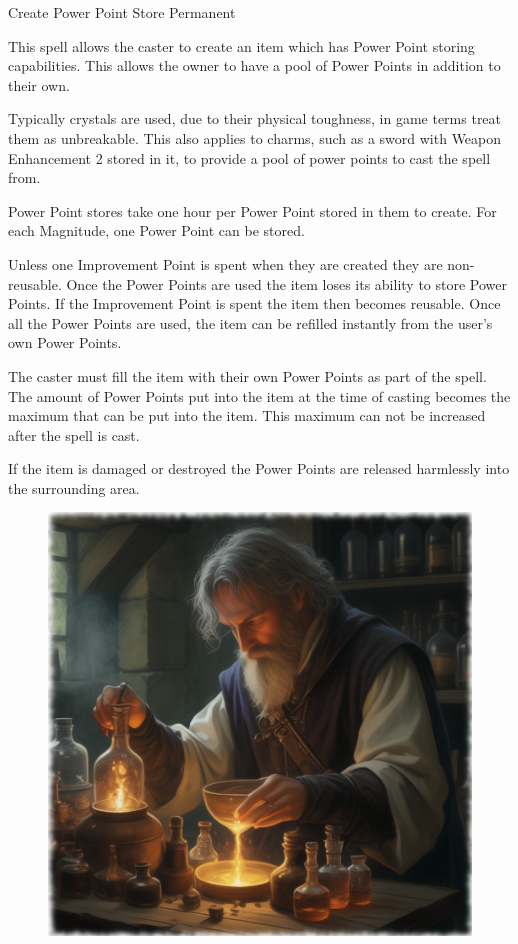 \begin{rpg-spell}
{Create Power Point Store}
{Permanent}

This spell allows the caster to create an item which has Power Point storing capabilities. This allows the owner to have a pool of Power Points in addition to their own.

Typically crystals are used, due to their physical toughness, in game terms treat them as unbreakable. This also applies to charms, such as a sword with Weapon Enhancement 2 stored in it, to provide a pool of power points to cast the spell from.

Power Point stores take one hour per Power Point stored in them to create. For each Magnitude, one Power Point can be stored.

Unless one Improvement Point is spent when they are created they are non-reusable. Once the Power Points are used the item loses its ability to store Power Points. If the Improvement Point is spent the item then becomes reusable. Once all the Power Points are used, the item can be refilled instantly from the user’s own Power Points.

The caster must fill the item with their own Power Points as part of the spell. The amount of Power Points put into the item at the time of casting becomes the maximum that can be put into the item. This maximum can not be increased after the spell is cast.

If the item is damaged or destroyed the Power Points are released harmlessly into the surrounding area.
\end{rpg-spell}



\begin{figure}[h]
\begin{center}
\includegraphics[scale=0.24]{img/ai-images/alchemist.png}
\end{center}
\end{figure}

